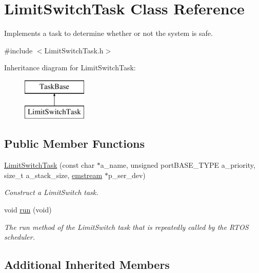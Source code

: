 \hypertarget{class_limit_switch_task}{}\section{Limit\+Switch\+Task Class Reference}
\label{class_limit_switch_task}


Implements a task to determine whether or not the system is safe.  




{\ttfamily \#include $<$Limit\+Switch\+Task.\+h$>$}

Inheritance diagram for Limit\+Switch\+Task\+:\begin{figure}[H]
\begin{center}
\leavevmode
\includegraphics[height=2.000000cm]{class_limit_switch_task}
\end{center}
\end{figure}
\subsection*{Public Member Functions}
\begin{DoxyCompactItemize}
\item 
\mbox{\hyperlink{class_limit_switch_task_a77a868a88b718c91292284e569f24b59}{Limit\+Switch\+Task}} (const char $\ast$a\+\_\+name, unsigned port\+B\+A\+S\+E\+\_\+\+T\+Y\+PE a\+\_\+priority, size\+\_\+t a\+\_\+stack\+\_\+size, \mbox{\hyperlink{classemstream}{emstream}} $\ast$p\+\_\+ser\+\_\+dev)
\begin{DoxyCompactList}\small\item\em Construct a Limit\+Switch task. \end{DoxyCompactList}\item 
void \mbox{\hyperlink{class_limit_switch_task_abf943a0f6ab5ab5fa9588f9cdbc6bc82}{run}} (void)
\begin{DoxyCompactList}\small\item\em The run method of the Limit\+Switch task that is repeatedly called by the R\+T\+OS scheduler. \end{DoxyCompactList}\end{DoxyCompactItemize}
\subsection*{Additional Inherited Members}


